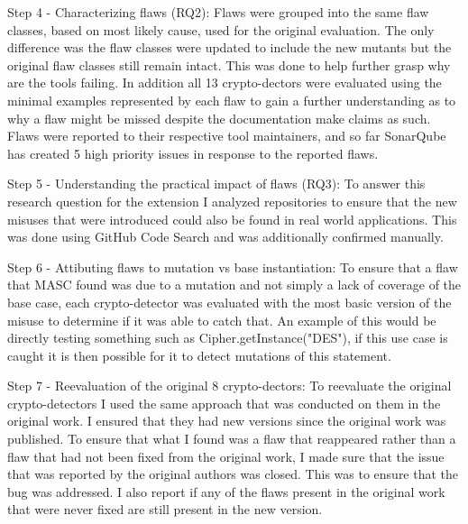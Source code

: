Step 4 - Characterizing flaws (RQ2): Flaws were grouped into the same flaw classes, based on most likely cause, used for the original evaluation. The only difference was the flaw classes were updated to include the new mutants but the original flaw classes still remain intact. This was done to help further grasp why are the tools failing. In addition all 13 crypto-dectors were evaluated using the minimal examples represented by each flaw to gain a further understanding as to why a flaw might be missed despite the documentation make claims as such. Flaws were reported to their respective tool maintainers, and so far SonarQube has created 5 high priority issues in response to the reported flaws.

Step 5 - Understanding the practical impact of flaws (RQ3): To answer this research question for the extension I analyzed repositories to ensure that the new misuses that were introduced could also be found in real world applications. This was done using GitHub Code Search and was additionally confirmed manually.

Step 6 - Attibuting flaws to mutation vs base instantiation: To ensure that a flaw that MASC found was due to a mutation and not simply a lack of coverage of the base case, each crypto-detector was evaluated with the most basic version of the misuse to determine if it was able to catch that. An example of this would be directly testing something such as Cipher.getInstance("DES"), if this use case is caught it is then possible for it to detect mutations of this statement.

Step 7 - Reevaluation of the original 8 crypto-dectors: To reevaluate the original crypto-detectors I used the same approach that was conducted on them in the original work. I ensured that they had new versions since the original work was published. To ensure that what I found was a flaw that reappeared rather than a flaw that had not been fixed from the original work, I made sure that the issue that was reported by the original authors was closed. This was to ensure that the bug was addressed. I also report if any of the flaws present in the original work that were never fixed are still present in the new version.